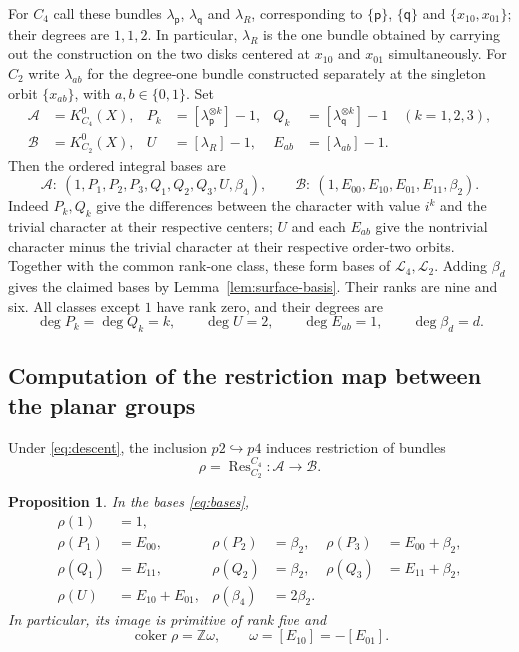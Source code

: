 \documentclass[11pt]{amsart}
\newcommand{\Z}{\mathbb Z}
\newcommand{\coker}{\operatorname{coker}}
\newcommand{\Res}{\operatorname{Res}}
\newcommand{\degc}{\operatorname{deg}}
\newtheorem{proposition}[theorem]{Proposition}
\theoremstyle{remark}
\numberwithin{equation}{section}
\begin{document}
For $C_4$ call these bundles $\lambda_{\mathsf p}$, $\lambda_{\mathsf q}$ and $\lambda_R$, corresponding to $\{\mathsf p\}$, $\{\mathsf q\}$ and $\{x_{10},x_{01}\}$; their degrees are $1,1,2$. In particular, $\lambda_R$ is the one bundle obtained by carrying out the construction on the two disks centered at $x_{10}$ and $x_{01}$ simultaneously. For $C_2$ write $\lambda_{ab}$ for the degree-one bundle constructed separately at the singleton orbit $\{x_{ab}\}$, with $a,b\in\{0,1\}$. Set
\begin{align*}
 \mathcal A&=K_{C_4}^0(X),&
 P_k&=[\lambda_{\mathsf p}^{\otimes k}]-1,&
 Q_k&=[\lambda_{\mathsf q}^{\otimes k}]-1\quad (k=1,2,3),\\
 \mathcal B&=K_{C_2}^0(X),&
 U&=[\lambda_R]-1,&
 E_{ab}&=[\lambda_{ab}]-1.
\end{align*}
Then the ordered integral bases are
\begin{equation}\label{eq:bases}
 \mathcal A:\ (1,P_1,P_2,P_3,Q_1,Q_2,Q_3,U,\beta_4),\qquad
 \mathcal B:\ (1,E_{00},E_{10},E_{01},E_{11},\beta_2).
\end{equation}
Indeed $P_k,Q_k$ give the differences between the character with
value $i^k$ and the trivial character at their respective centers;
$U$ and each $E_{ab}$ give the nontrivial character minus the
trivial character at their respective order-two orbits. Together
with the common rank-one class, these form bases of
$\mathcal L_4,\mathcal L_2$. Adding $\beta_d$ gives the claimed
bases by Lemma~\ref{lem:surface-basis}. Their ranks are nine and six.
All classes except $1$ have rank zero, and their degrees are
\[
 \degc P_k=\degc Q_k=k,\qquad
 \degc U=2,\qquad \degc E_{ab}=1,\qquad \degc\beta_d=d.
\]


\subsection{Computation of the restriction map between the planar groups}\label{sec:restriction}

Under \eqref{eq:descent}, the inclusion $p2\hookrightarrow p4$ induces restriction of bundles
\[
 \rho=\Res_{C_2}^{C_4}\colon\mathcal A\longrightarrow\mathcal B.
\]

\begin{proposition}\label{prop:restriction}
In the bases \eqref{eq:bases},
\begin{equation*}
\begin{aligned}
 \rho(1)&=1,\\
 \rho(P_1)&=E_{00},&\rho(P_2)&=\beta_2,
     &\rho(P_3)&=E_{00}+\beta_2,\\
 \rho(Q_1)&=E_{11},&\rho(Q_2)&=\beta_2,
     &\rho(Q_3)&=E_{11}+\beta_2,\\
 \rho(U)&=E_{10}+E_{01},&\rho(\beta_4)&=2\beta_2.
\end{aligned}
\end{equation*}
In particular, its image is primitive of rank five and
\[
 \coker\rho=\Z\omega,\qquad \omega=[E_{10}]=-[E_{01}].
\]
\end{proposition}
\end{document}
